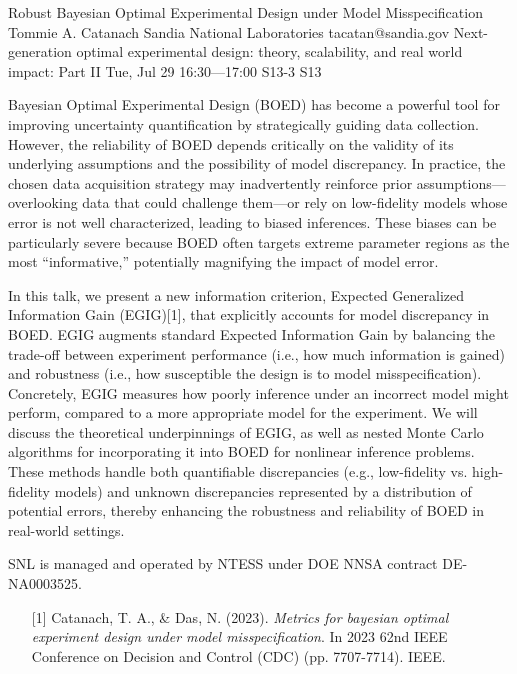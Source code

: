 \begin{talk}
  {Robust Bayesian Optimal Experimental Design under Model Misspecification}%
  {Tommie A. Catanach}%
  {Sandia National Laboratories}%
  {tacatan@sandia.gov}%
  {Next-generation optimal experimental design: theory, scalability, and real world impact: Part II}%
  {}%
  {Tue, Jul 29 16:30---17:00}%
  {S13-3}%
  {S13}%
    
   
Bayesian Optimal Experimental Design (BOED) has become a powerful tool for improving uncertainty quantification by strategically guiding data collection. However, the reliability of BOED depends critically on the validity of its underlying assumptions and the possibility of model discrepancy. In practice, the chosen data acquisition strategy may inadvertently reinforce prior assumptions—overlooking data that could challenge them—or rely on low-fidelity models whose error is not well characterized, leading to biased inferences. These biases can be particularly severe because BOED often targets extreme parameter regions as the most “informative,” potentially magnifying the impact of model error.

In this talk, we present a new information criterion, Expected Generalized Information Gain (EGIG)[1], that explicitly accounts for model discrepancy in BOED. EGIG augments standard Expected Information Gain by balancing the trade-off between experiment performance (i.e., how much information is gained) and robustness (i.e., how susceptible the design is to model misspecification). Concretely, EGIG measures how poorly inference under an incorrect model might perform, compared to a more appropriate model for the experiment. We will discuss the theoretical underpinnings of EGIG, as well as nested Monte Carlo algorithms for incorporating it into BOED for nonlinear inference problems. These methods handle both quantifiable discrepancies (e.g., low-fidelity vs. high-fidelity models) and unknown discrepancies represented by a distribution of potential errors, thereby enhancing the robustness and reliability of BOED in real-world settings.

SNL is managed and operated by NTESS under DOE NNSA contract DE-NA0003525. 
\medskip

\begin{enumerate}
 \item[{[1]}] Catanach, T. A., \& Das, N. (2023). {\it Metrics for bayesian optimal experiment design under model misspecification}. In 2023 62nd IEEE Conference on Decision and Control (CDC) (pp. 7707-7714). IEEE.
\end{enumerate}
\end{talk}

